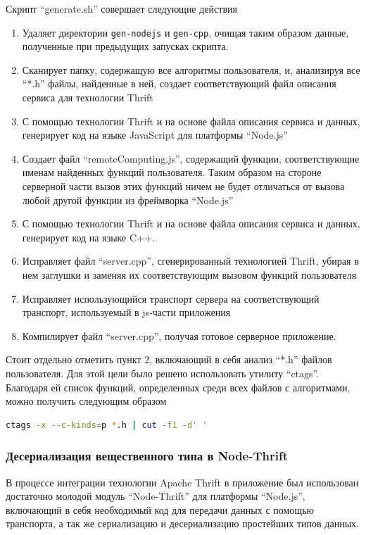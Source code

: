 \documentclass[14pt, a4paper]{extarticle}
\begin{document}
Скрипт ``generate.sh'' совершает следующие действия
\begin{enumerate}
    \item Удаляет директории \texttt{gen-nodejs} и \texttt{gen-cpp}, очищая
    таким образом данные, полученные при предыдущих запусках скрипта.
    \item Сканирует папку, содержащую все алгоритмы пользователя, и, анализируя
    все ``*.h'' файлы, найденные в ней, создает соответствующий файл описания
    сервиса для технологии Thrift
    \item С помощью технологии Thrift и на основе файла описания сервиса и
    данных, генерирует код на языке JavaScript для платформы ``Node.js''
    \item Создает файл ``remoteComputing.js'', содержащий функции,
    соответствующие именам найденных функций пользователя. Таким образом на
    стороне серверной части вызов этих функций ничем не будет отличаться
    от вызова любой другой функции из фреймворка ``Node.js''
    \item С помощью технологии Thrift и на основе файла описания сервиса и
    данных, генерирует код на языке C++.
    \item Исправляет файл ``server.cpp'', сгенерированный технологией Thrift,
    убирая в нем заглушки и заменяя их соответствующим вызовом функций
    пользователя
    \item Исправляет использующийся транспорт сервера на соответствующий
    транспорт, используемый в js-части приложения
    \item Компилирует файл ``server.cpp'', получая готовое серверное приложение.
\end{enumerate}

Стоит отдельно отметить пункт 2, включающий в себя анализ ``*.h'' файлов
пользователя. Для этой цели было решено использовать утилиту ``ctags''.
Благодаря ей список функций, определенных среди всех файлов с алгоритмами, можно
получить следующим образом
\begin{lstlisting}[language=bash]
    ctags -x --c-kinds=p *.h | cut -f1 -d' '
\end{lstlisting}

\subsubsection{Десериализация вещественного типа в Node-Thrift}

В процессе интеграции технологии Apache Thrift в приложение был использован
достаточно молодой модуль ``Node-Thrift'' для платформы ``Node.js'', включающий
в себя
необходимый код для передачи данных с помощью транспорта, а так же сериализацию
и десериализацию простейших типов данных.
\end{document}

